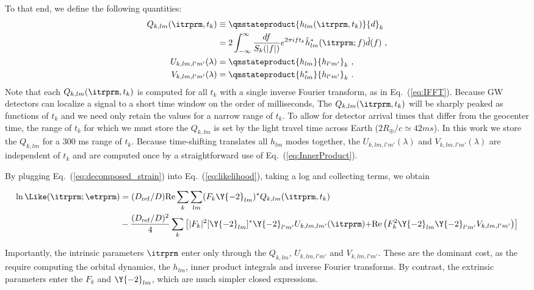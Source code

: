 To that end, we define the following quantities:
\begin{subequations}
\label{eq:QUV}
\begin{align}
Q_{k,lm}(\itrprm,t_k) &\equiv \qmstateproduct{h_{lm}(\itrprm,t_k)}{d}_k \nonumber\\
&= 2 \int_{-\infty}^{\infty} \frac{df}{S_k(|f|)} e^{2\pi i f t_k} \tilde{h}_{lm}^*(\itrprm;f) \tilde{d}(f)\ , \\
{ U_{k,lm,l'm'}(\lambda)}& = \qmstateproduct{h_{lm}}{h_{l'm'}}_k\ , \\
V_{k,lm,l'm'}(\lambda)& = \qmstateproduct{h_{lm}^*}{h_{l'm'}}_k  \ .
\end{align}
\end{subequations}
Note that each $Q_{k,lm}(\itrprm,t_k)$ is computed for all $t_k$ with a single inverse Fourier transform, 
as in Eq.~(\ref{eq:IFFT}). Because GW detectors can localize a signal to a short time window 
on the order of milliseconds, The $Q_{k,lm}(\itrprm,t_k)$ will be sharply peaked as functions of $t_k$ 
and we need only retain the values for a narrow range of $t_k$. To allow for detector arrival times that differ
from the geocenter time, the range of $t_k$ for which we must store the $Q_{k,lm}$ is set by the light travel
time across Earth ($2R_{\oplus}/c\simeq 42 \unit{ms}$).   In this work we store the $Q_{k,lm}$ for a $300$ ms range of
$t_k$.  
Because time-shifting translates all $h_{lm}$ modes together, 
the $U_{k,lm,l'm'}(\lambda)$ and $V_{k,lm,l'm'}(\lambda)$ are independent of $t_k$
and are computed once by a straightforward use of Eq.~(\ref{eq:InnerProduct}).


By plugging Eq.~(\ref{eq:decomposed_strain}) into Eq.~(\ref{eq:likelihood}), taking a log and collecting terms, we obtain
\begin{widetext}
\begin{align}
\ln \Like(\itrprm; \etrprm) 
&= (D_{\rm ref}/D) \text{Re} \sum_k \sum_{lm}(F_k \Y{-2}_{lm})^* Q_{k,lm}(\itrprm,t_k)\nonumber \\
&   -\frac{(D_{\rm ref}/D)^2}{4}\sum_k
\left[
{
|F_k|^2 [\Y{-2}_{lm}]^*\Y{-2}_{l'm'} U_{k,lm,lm'}(\itrprm)
}
 {
+  \text{Re} \left( F_k^2 \Y{-2}_{lm} \Y{-2}_{l'm'} V_{k,lm,l'm'} \right)
}
\right]
\label{eq:def:lnL:Decomposed}
\end{align}
\end{widetext}
Importantly, the intrinsic parameters $\itrprm$ enter only through the $Q_{k,lm}$, $U_{k,lm,l'm'}$ and $V_{k,lm,l'm'}$.
These are the dominant cost, as the require computing the orbital dynamics, the $h_{lm}$, inner product integrals
and inverse Fourier transforms. By contrast, the extrinsic parameters enter the $F_k$ and $\Y{-2}_{lm}$,
which are much simpler closed expressions.

